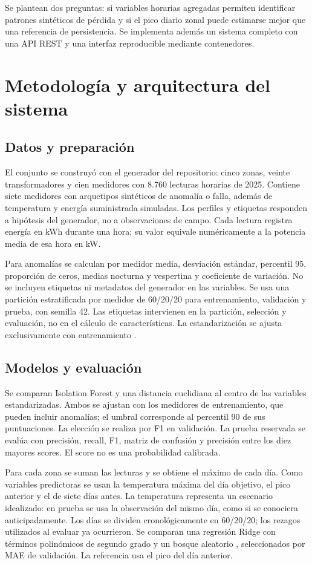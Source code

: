 \documentclass[conference]{IEEEtran}
\begin{document}
Se plantean dos preguntas: si variables horarias agregadas permiten identificar patrones sintéticos de pérdida y si el pico diario zonal puede estimarse mejor que una referencia de persistencia. Se implementa además un sistema completo con una API REST y una interfaz reproducible mediante contenedores.
\section{Metodología y arquitectura del sistema}
\subsection{Datos y preparación}
El conjunto se construyó con el generador del repositorio: cinco zonas, veinte transformadores y cien medidores con 8.760 lecturas horarias de 2025. Contiene siete medidores con arquetipos sintéticos de anomalía o falla, además de temperatura y energía suministrada simuladas. Los perfiles y etiquetas responden a hipótesis del generador, no a observaciones de campo. Cada lectura registra energía en kWh durante una hora; su valor equivale numéricamente a la potencia media de esa hora en kW.

Para anomalías se calculan por medidor media, desviación estándar, percentil 95, proporción de ceros, medias nocturna y vespertina y coeficiente de variación. No se incluyen etiquetas ni metadatos del generador en las variables. Se usa una partición estratificada por medidor de 60/20/20 para entrenamiento, validación y prueba, con semilla 42. Las etiquetas intervienen en la partición, selección y evaluación, no en el cálculo de características. La estandarización se ajusta exclusivamente con entrenamiento \cite{pitfalls}.
\subsection{Modelos y evaluación}
Se comparan Isolation Forest y una distancia euclidiana al centro de las variables estandarizadas. Ambos se ajustan con los medidores de entrenamiento, que pueden incluir anomalías; el umbral corresponde al percentil 90 de sus puntuaciones. La elección se realiza por F1 en validación. La prueba reservada se evalúa con precisión, recall, F1, matriz de confusión y precisión entre los diez mayores scores. El score no es una probabilidad calibrada.

Para cada zona se suman las lecturas y se obtiene el máximo de cada día. Como variables predictoras se usan la temperatura máxima del día objetivo, el pico anterior y el de siete días antes. La temperatura representa un escenario idealizado: en prueba se usa la observación del mismo día, como si se conociera anticipadamente. Los días se dividen cronológicamente en 60/20/20; los rezagos utilizados al evaluar ya ocurrieron. Se comparan una regresión Ridge con términos polinómicos de segundo grado y un bosque aleatorio \cite{forest}, seleccionados por MAE de validación. La referencia usa el pico del día anterior.
\end{document}
